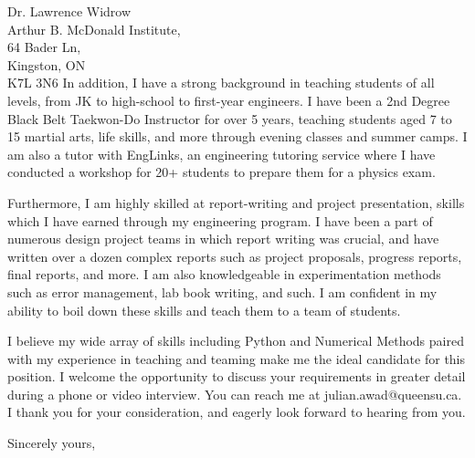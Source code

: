 \documentclass[11pt]{letter} %
\begin{document}
\begin{letter}{Dr. Lawrence Widrow \\
Arthur B. McDonald Institute, \\
64 Bader Ln, \\
Kingston, ON \\
K7L 3N6}
In addition, I have a strong background in teaching students of all levels, from JK to high-school to first-year engineers. I have been a 2nd Degree Black Belt Taekwon-Do Instructor for over 5 years, teaching students aged 7 to 15 martial arts, life skills, and more through evening classes and summer camps. I am also a tutor with EngLinks, an engineering tutoring service where I have conducted a workshop for 20+ students to prepare them for a physics exam.

Furthermore, I am highly skilled at report-writing and project presentation, skills which I have earned through my engineering program. I have been a part of numerous design project teams in which report writing was crucial, and have written over a dozen complex reports such as project proposals, progress reports, final reports, and more. I am also knowledgeable in experimentation methods such as error management, lab book writing, and such. I am confident in my ability to boil down these skills and teach them to a team of students.

I believe my wide array of skills including Python and Numerical Methods paired with my experience in teaching and teaming make me the ideal candidate for this position. I welcome the opportunity to discuss your requirements in greater detail during a phone or video interview. You can reach me at julian.awad@queensu.ca. I thank you for your consideration, and eagerly look forward to hearing from you.

\closing{Sincerely yours,}


\end{letter}
\end{document}
